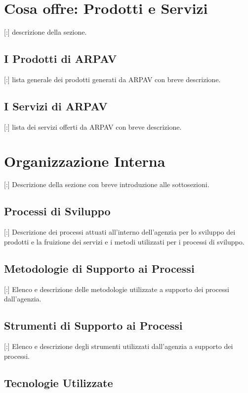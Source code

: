 \section{Cosa offre: Prodotti e Servizi}

[:] descrizione della sezione.

\subsection{I Prodotti di ARPAV}

[:] lista generale dei prodotti generati da ARPAV con breve descrizione.

\subsection{I Servizi di ARPAV}

[:] lista dei servizi offerti da ARPAV con breve descrizione.

\section{Organizzazione Interna}

[:] Descrizione della sezione con breve introduzione alle sottosezioni.

\subsection{Processi di Sviluppo}

[:] Descrizione dei processi attuati all'interno dell'agenzia per lo sviluppo dei prodotti e la fruizione dei servizi e i metodi utilizzati per i processi di sviluppo.

\subsection{Metodologie di Supporto ai Processi}

[:] Elenco e descrizione delle metodologie utilizzate a supporto dei processi dall'agenzia.

\subsection{Strumenti di Supporto ai Processi}

[:] Elenco e descrizione degli strumenti utilizzati dall'agenzia a supporto dei processi.

\subsection{Tecnologie Utilizzate}

